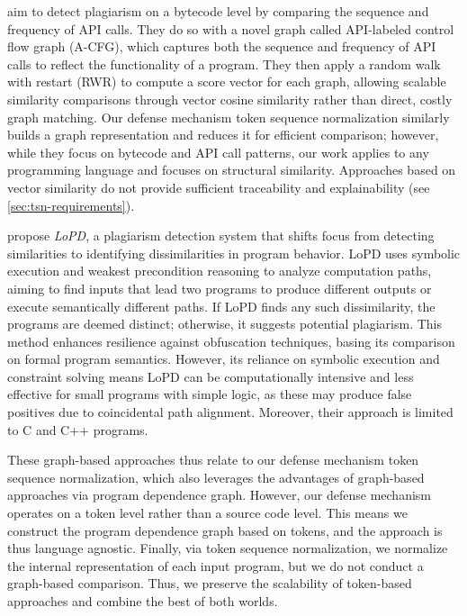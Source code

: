 \citet{chae2013} aim to detect plagiarism on a bytecode level by comparing the sequence and frequency of API calls. They do so with a novel graph called API-labeled control flow graph (A-CFG), which captures both the sequence and frequency of API calls to reflect the functionality of a program. They then apply a random walk with restart (RWR) to compute a score vector for each graph, allowing scalable similarity comparisons through vector cosine similarity rather than direct, costly graph matching.
%
Our defense mechanism token sequence normalization similarly builds a graph representation and reduces it for efficient comparison; however, while they focus on bytecode and API call patterns, our work applies to any programming language and focuses on structural similarity. Approaches based on vector similarity do not provide sufficient traceability and explainability (see \autoref{sec:tsn-requirements}).


\citet{zhang2014} propose \emph{LoPD}, a plagiarism detection system that shifts focus from detecting similarities to identifying dissimilarities in program behavior. LoPD uses symbolic execution and weakest precondition reasoning to analyze computation paths, aiming to find inputs that lead two programs to produce different outputs or execute semantically different paths. If LoPD finds any such dissimilarity, the programs are deemed distinct; otherwise, it suggests potential plagiarism. This method enhances resilience against obfuscation techniques, basing its comparison on formal program semantics.
However, its reliance on symbolic execution and constraint solving means LoPD can be computationally intensive and less effective for small programs with simple logic, as these may produce false positives due to coincidental path alignment. Moreover, their approach is limited to C and C++ programs.

These graph-based approaches thus relate to our defense mechanism token sequence normalization, which also leverages the advantages of graph-based approaches via program dependence graph. However, our defense mechanism operates on a token level rather than a source code level. This means we construct the program dependence graph based on tokens, and the approach is thus language agnostic. Finally, via token sequence normalization, we normalize the internal representation of each input program, but we do not conduct a graph-based comparison. Thus, we preserve the scalability of token-based approaches and combine the best of both worlds.

